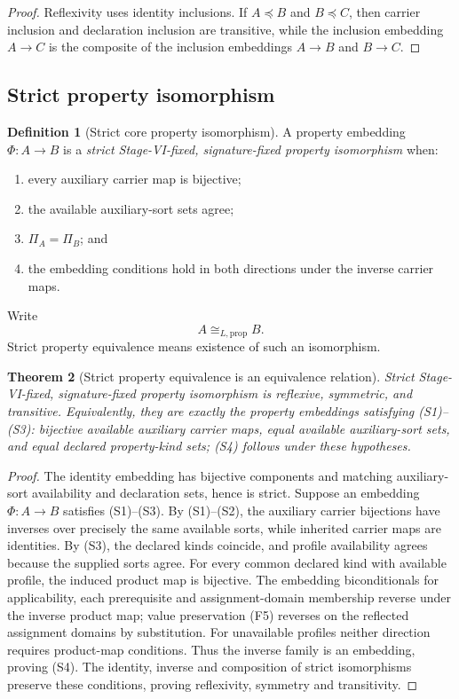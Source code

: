 \documentclass[11pt]{article}
\newtheorem{theorem}{Theorem}[section]
\theoremstyle{definition}
\newtheorem{definition}[theorem]{Definition}
\theoremstyle{remark}
\begin{document}
\begin{proof}
Reflexivity uses identity inclusions.
If \(A\preccurlyeq B\) and \(B\preccurlyeq C\), then carrier inclusion and declaration inclusion are transitive, while the inclusion embedding \(A\to C\) is the composite of the inclusion embeddings \(A\to B\) and \(B\to C\).
\end{proof}

\subsection{Strict property isomorphism}

\begin{definition}[Strict core property isomorphism]
\label{def:strict-iso}
A property embedding \(\Phi:A\to B\) is a \emph{strict Stage-VI-fixed, signature-fixed property isomorphism} when:
\begin{enumerate}[label=(S\arabic*)]
\item every auxiliary carrier map is bijective;
\item the available auxiliary-sort sets agree;
\item \(\Pi_A=\Pi_B\); and
\item the embedding conditions hold in both directions under the inverse carrier maps.
\end{enumerate}
Write
\[
A\cong_{L,\mathrm{prop}} B.
\]
Strict property equivalence means existence of such an isomorphism.
\end{definition}

\begin{theorem}[Strict property equivalence is an equivalence relation]
\label{thm:strict-equivalence}
Strict Stage-VI-fixed, signature-fixed property isomorphism is reflexive, symmetric, and transitive.
Equivalently, they are exactly the property embeddings satisfying (S1)--(S3): bijective available auxiliary carrier maps, equal available auxiliary-sort sets, and equal declared property-kind sets; (S4) follows under these hypotheses.
\end{theorem}

\begin{proof}
The identity embedding has bijective components and matching auxiliary-sort availability and declaration sets, hence is strict.
Suppose an embedding \(\Phi:A\to B\) satisfies (S1)--(S3).
By (S1)--(S2), the auxiliary carrier bijections have inverses over precisely the same available sorts, while inherited carrier maps are identities.
By (S3), the declared kinds coincide, and profile availability agrees because the supplied sorts agree.
For every common declared kind with available profile, the induced product map is bijective.
The embedding biconditionals for applicability, each prerequisite and assignment-domain membership reverse under the inverse product map; value preservation (F5) reverses on the reflected assignment domains by substitution.
For unavailable profiles neither direction requires product-map conditions.
Thus the inverse family is an embedding, proving (S4).
The identity, inverse and composition of strict isomorphisms preserve these conditions, proving reflexivity, symmetry and transitivity.
\end{proof}
\end{document}
